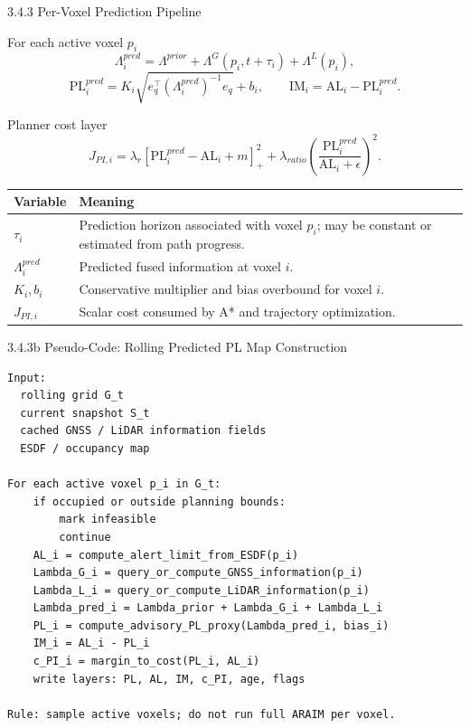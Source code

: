 \documentclass[10pt,aspectratio=169,xcolor=dvipsnames]{beamer}
\newcommand{\PL}{\mathrm{PL}}
\newcommand{\AL}{\mathrm{AL}}
\newcommand{\IM}{\mathrm{IM}}
\begin{document}
\begin{frame}{3.4.3 Per-Voxel Prediction Pipeline}
  \small
  \begin{block}{For each active voxel $p_i$}
    \[
      \Lambda^{pred}_i=\Lambda^{prior}+\Lambda^G(p_i,t+\tau_i)+\Lambda^L(p_i),
    \]
    \[
      \PL^{pred}_i=K_i\sqrt{e_q^\top(\Lambda^{pred}_i)^{-1}e_q}+b_i,
      \qquad
      \IM_i=\AL_i-\PL^{pred}_i.
    \]
  \end{block}

  \begin{block}{Planner cost layer}
    \[
      J_{PI,i}=\lambda_r[\PL^{pred}_i-\AL_i+m]^2_+
      +\lambda_{ratio}\left(\frac{\PL^{pred}_i}{\AL_i+\epsilon}\right)^2.
    \]
  \end{block}

  \begin{table}\scriptsize
    \begin{tabular}{p{} p{}}
      \toprule
      \textbf{Variable} & \textbf{Meaning}\\
      \midrule
      $\tau_i$ & Prediction horizon associated with voxel $p_i$; may be constant or estimated from path progress.\\
      $\Lambda^{pred}_i$ & Predicted fused information at voxel $i$.\\
      $K_i,b_i$ & Conservative multiplier and bias overbound for voxel $i$.\\
      $J_{PI,i}$ & Scalar cost consumed by A* and trajectory optimization.\\
      \bottomrule
    \end{tabular}
  \end{table}
\end{frame}

\begin{frame}[fragile]{3.4.3b Pseudo-Code: Rolling Predicted PL Map Construction}
\begin{lstlisting}
Input:
  rolling grid G_t
  current snapshot S_t
  cached GNSS / LiDAR information fields
  ESDF / occupancy map

For each active voxel p_i in G_t:
    if occupied or outside planning bounds:
        mark infeasible
        continue
    AL_i = compute_alert_limit_from_ESDF(p_i)
    Lambda_G_i = query_or_compute_GNSS_information(p_i)
    Lambda_L_i = query_or_compute_LiDAR_information(p_i)
    Lambda_pred_i = Lambda_prior + Lambda_G_i + Lambda_L_i
    PL_i = compute_advisory_PL_proxy(Lambda_pred_i, bias_i)
    IM_i = AL_i - PL_i
    c_PI_i = margin_to_cost(PL_i, AL_i)
    write layers: PL, AL, IM, c_PI, age, flags

Rule: sample active voxels; do not run full ARAIM per voxel.
\end{lstlisting}
\end{frame}
\end{document}
